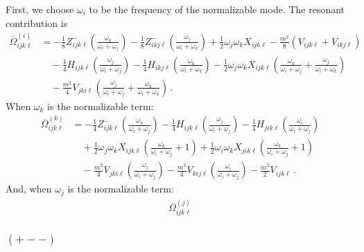 \documentclass[letterpaper,11pt]{article}
\newcommand{\oi}{\omega_i}
\newcommand{\oj}{\omega_j}
\newcommand{\ok}{\omega_k}
\begin{document}
First, we choose $\omega_i$ to be the frequency of the normalizable mode. The resonant contribution is
\begin{align}
\overline{\Omega}^{(i)}_{ijk\ell} &= -\frac{1}{8} Z^{-}_{ijk\ell} \left( \frac{\ok}{\oi + \oj} \right) - \frac{1}{8} Z^{-}_{ikj\ell} \left( \frac{\oj}{\oi + \ok} \right) + \frac{1}{2} \oj \ok X_{ijk\ell} - \frac{m^2}{8} \left( V_{ijk\ell} + V_{ikj\ell} \right) \nonumber \\
%
& \quad -\frac{1}{4} H_{ijk\ell} \left( \frac{\oj}{\oi + \oj} \right) - \frac{1}{4} H_{ikj\ell} \left( \frac{\ok}{\oi + \ok} \right) - \frac{1}{2} \oj \ok X_{ijk\ell} \left( \frac{\ok}{\oi + \oj} + \frac{\oj}{\oi + \ok} \right) \nonumber \\
%
& \quad - \frac{m^2}{4} V_{jki\ell} \left( \frac{\oj}{\oi + \oj} + \frac{\ok}{\oi + \ok} \right) \, .
\end{align}
When $\ok$ is the normalizable term:
\begin{align}
\overline{\Omega}^{(k)}_{ijk\ell} &= - \frac{1}{4} Z^{-}_{ijk\ell} \left( \frac{\ok}{\oi + \oj} \right) - \frac{1}{4} H_{ijk\ell} \left( \frac{\oj}{\oi + \oj} \right) - \frac{1}{4} H_{jik\ell} \left( \frac{\oi}{\oi + \oj} \right) \nonumber \\
%
& \quad + \frac{1}{2} \oj \ok X_{ijk\ell} \left( \frac{\ok}{\oi + \oj} + 1 \right) + \frac{1}{2} \oi \ok X_{jik\ell} \left( \frac{\ok}{\oi + \oj} + 1 \right)  \nonumber \\
%
& \quad - \frac{m^2}{4} V_{jki\ell} \left( \frac{\oj}{\oi + \oj} \right) - \frac{m^2}{4} V_{kij\ell} \left( \frac{\oi}{\oi + \oj} \right) - \frac{m^2}{2} V_{ijk\ell} \, .
\end{align}
And, when $\oj$ is the normalizable term:
\begin{align}
\overline{\Omega}^{(j)}_{ijk\ell}
\end{align}

\subsubsection{$(+ - - )$}
\end{document}
